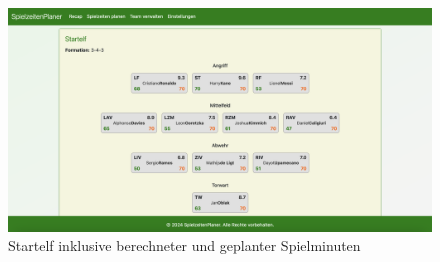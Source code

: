 \begin{figure}[h]
  \centering
  \includegraphics[width=\textwidth]{screenshots/spielzeiten.png}
  \caption{Startelf inklusive berechneter und geplanter Spielminuten}
  \label{fig:spielzeiten}
\end{figure}

\pagebreak

